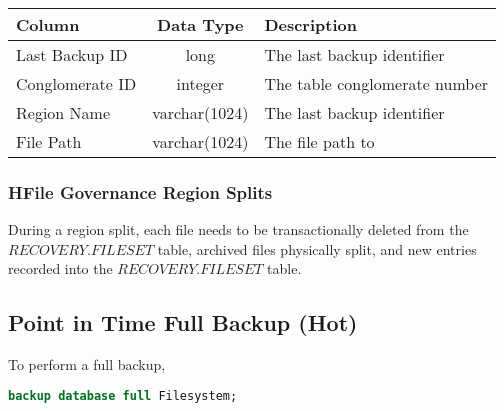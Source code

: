 \begin{center}
\begin{tabular}{|l|c|p{5cm}|}
				\hline
				\bf{Column}							&	\bf{Data Type}	&	\bf{Description} \\ \hline
				Last Backup ID							&	long			&	The last backup identifier				
				\\
				\hline 
				Conglomerate ID							&	integer			&	The table conglomerate number				
				\\
				\hline 
				Region Name							&	varchar(1024)			&	The last backup identifier				
				\\
				\hline 
				File Path							&	varchar(1024)			&	The file path to 				
				\\
				\hline 

	\end{tabular}
\end{center}

\subsubsection{HFile Governance Region Splits}

During a region split, each file needs to be transactionally deleted from the
$RECOVERY.FILESET$ table, archived files physically split, and new
entries recorded into the $RECOVERY.FILESET$ table.

\subsection{Point in Time Full Backup (Hot)}

To perform a full backup,

\begin{lstlisting}[frame=single,captionpos=b,language=SQL,caption=Procedure to
Perform a Full Backup] 
backup database full Filesystem;
\end{lstlisting}


